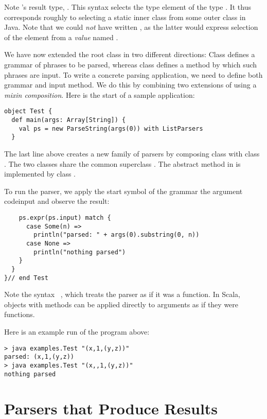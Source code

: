 {Note 's result type, . This syntax
selects the type element  of the type . It
thus corresponds roughly to selecting a static inner class from some
outer class in Java. Note that we could {\em not} have written
, as the latter would express selection of the
 element from a {\em value} named .

We have now extended the root class  in two different
directions: Class  defines a grammar of phrases to
be parsed, whereas class  defines a method by which
such phrases are input. To write a concrete parsing application, we
need to define both grammar and input method. We do this by combining
two extensions of  using a {\em mixin composition}.
Here is the start of a sample application:
\begin{lstlisting}
object Test {
  def main(args: Array[String]) {
    val ps = new ParseString(args(0)) with ListParsers
  }
\end{lstlisting}
The last line above creates a new family of parsers by composing class
 with class . The two classes
share the common superclass . The abstract method
 in  is implemented by class .

To run the parser, we apply the start symbol of the grammar
 the argument code{input} and observe the result:
\begin{lstlisting}
    ps.expr(ps.input) match {
      case Some(n) =>
        println("parsed: " + args(0).substring(0, n))
      case None =>
        println("nothing parsed")
    }
  }
}// end Test
\end{lstlisting}
Note the syntax ~, which treats the 
parser as if it was a function. In Scala, objects with 
methods can be applied directly to arguments as if they were functions.

Here is an example run of the program above:
\begin{lstlisting}
> java examples.Test "(x,1,(y,z))"
parsed: (x,1,(y,z))
> java examples.Test "(x,,1,(y,z))"
nothing parsed
\end{lstlisting}

\section{\label{sec:parsers-results}Parsers that Produce Results}

}
